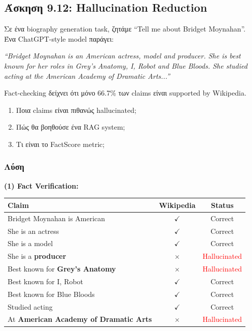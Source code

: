 \subsection{Άσκηση 9.12: Hallucination Reduction}

\begin{formulabox}[Εκφώνηση]
Σε ένα biography generation task, ζητάμε ``Tell me about Bridget Moynahan''.
Ένα ChatGPT-style model παράγει:

\textit{``Bridget Moynahan is an American actress, model and producer. She is best known for her roles in Grey's Anatomy, I, Robot and Blue Bloods. She studied acting at the American Academy of Dramatic Arts...''}

Fact-checking δείχνει ότι μόνο 66.7\% των claims είναι supported by Wikipedia.

\begin{enumerate}
    \item Ποια claims είναι πιθανώς hallucinated;
    \item Πώς θα βοηθούσε ένα RAG system;
    \item Τι είναι το FactScore metric;
\end{enumerate}
\end{formulabox}

\subsubsection*{Λύση}

\textbf{(1) Fact Verification:}

\begin{center}
\begin{tabular}{lcc}
\toprule
\textbf{Claim} & \textbf{Wikipedia} & \textbf{Status} \\
\midrule
Bridget Moynahan is American & $\checkmark$ & Correct \\
She is an actress & $\checkmark$ & Correct \\
She is a model & $\checkmark$ & Correct \\
She is a \textbf{producer} & $\times$ & \textcolor{red}{Hallucinated} \\
Best known for \textbf{Grey's Anatomy} & $\times$ & \textcolor{red}{Hallucinated} \\
Best known for I, Robot & $\checkmark$ & Correct \\
Best known for Blue Bloods & $\checkmark$ & Correct \\
Studied acting & $\checkmark$ & Correct \\
At \textbf{American Academy of Dramatic Arts} & $\times$ & \textcolor{red}{Hallucinated} \\
\bottomrule
\end{tabular}
\end{center}

